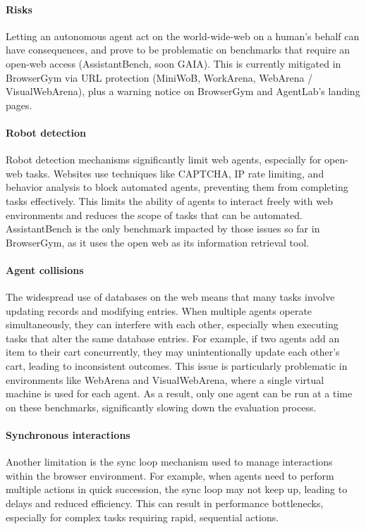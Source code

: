 \documentclass[10pt]{article} %
\begin{document}
\paragraph{Risks} Letting an autonomous agent act on the world-wide-web on a human's behalf can have consequences, and prove to be problematic on benchmarks that require an open-web access (AssistantBench, soon GAIA). This is currently mitigated in BrowserGym via URL protection (MiniWoB, WorkArena, WebArena / VisualWebArena), plus a warning notice on BrowserGym and AgentLab's landing pages.

\paragraph{Robot detection} 
Robot detection mechanisms significantly limit web agents, especially for open-web tasks. Websites use techniques like CAPTCHA, IP rate limiting, and behavior analysis to block automated agents, preventing them from completing tasks effectively. This limits the ability of agents to interact freely with web environments and reduces the scope of tasks that can be automated. AssistantBench is the only benchmark impacted by those issues so far in BrowserGym, as it uses the open web as its information retrieval tool.

\paragraph{Agent collisions} 
The widespread use of databases on the web means that many tasks involve updating records and modifying entries. When multiple agents operate simultaneously, they can interfere with each other, especially when executing tasks that alter the same database entries. For example, if two agents add an item to their cart concurrently, they may unintentionally update each other's cart, leading to inconsistent outcomes. This issue is particularly problematic in environments like WebArena and VisualWebArena, where a single virtual machine is used for each agent. As a result, only one agent can be run at a time on these benchmarks, significantly slowing down the evaluation process. 

\paragraph{Synchronous interactions} Another limitation is the sync loop mechanism used to manage interactions within the browser environment. For example, when agents need to perform multiple actions in quick succession, the sync loop may not keep up, leading to delays and reduced efficiency. This can result in performance bottlenecks, especially for complex tasks requiring rapid, sequential actions.
\end{document}

